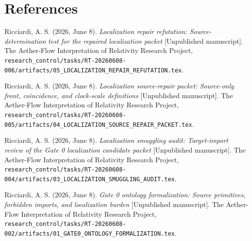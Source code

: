 \documentclass[11pt]{article}
\begin{document}
\section*{References}

Ricciardi, A. S. (2026, June 8). \emph{Localization repair refutation:
Source-determination test for the repaired localization packet} [Unpublished
manuscript]. The Aether-Flow Interpretation of Relativity Research Project,
\texttt{research\_control/tasks/RT-20260608-006/artifacts/05\_LOCALIZATION\_REPAIR\_REFUTATION.tex}.

Ricciardi, A. S. (2026, June 8). \emph{Localization source-repair packet:
Source-only front, coincidence, and clock-scale definitions} [Unpublished
manuscript]. The Aether-Flow Interpretation of Relativity Research Project,
\texttt{research\_control/tasks/RT-20260608-005/artifacts/04\_LOCALIZATION\_SOURCE\_REPAIR\_PACKET.tex}.

Ricciardi, A. S. (2026, June 8). \emph{Localization smuggling audit:
Target-import review of the Gate 0 localization candidate packet}
[Unpublished manuscript]. The Aether-Flow Interpretation of Relativity
Research Project,
\texttt{research\_control/tasks/RT-20260608-004/artifacts/03\_LOCALIZATION\_SMUGGLING\_AUDIT.tex}.

Ricciardi, A. S. (2026, June 8). \emph{Gate 0 ontology formalization: Source
primitives, forbidden imports, and localization burden} [Unpublished
manuscript]. The Aether-Flow Interpretation of Relativity Research Project,
\texttt{research\_control/tasks/RT-20260608-002/artifacts/01\_GATE0\_ONTOLOGY\_FORMALIZATION.tex}.
\end{document}
